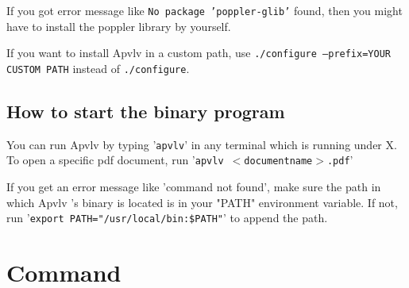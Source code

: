 \documentclass[a4paper,12pt]{article}
\newcommand{\apvlv}{\textsf{Apvlv{ }}}
\begin{document}
If you got error message like \texttt{No package 'poppler-glib'} found, then you might have to install the poppler library by yourself.

If you want to install \apvlv in a custom path, use \texttt{./configure --prefix=YOUR CUSTOM PATH} instead of \texttt{./configure}.

\subsection{How to start the binary program}\label{sstart}

You can run \apvlv by typing '\texttt{apvlv}' in any terminal which is running under X. To open a specific pdf document, run '\texttt{apvlv $<$documentname$>$.pdf}'

If you get an error message like 'command not found', make sure the path in which \apvlv's binary is located is in your "PATH" environment variable. 
If not, run '\texttt{export PATH="/usr/local/bin:\$PATH"}' to append the path.

\newpage

\section{Command}\label{command}
\end{document}
